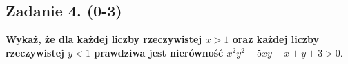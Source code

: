 \subsection*{Zadanie 4. (0-3)}
\textbf{Wykaż, że dla każdej liczby rzeczywistej $x>1$ oraz każdej liczby rzeczywistej $y<1$ prawdziwa jest nierówność $x^{2}y^{2}-5xy+x+y+3>0$}. 